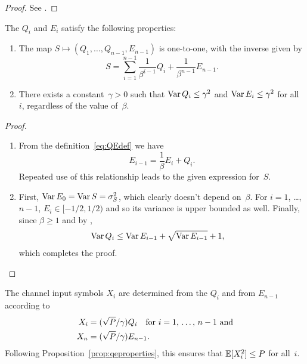 \begin{proof}
  See .
\end{proof}



\begin{proposition}
  \label{prop:qeproperties}
  The $Q_i$ and $E_i$ satisfy the following properties:
\begin{enumerate}
  \item The map $S \mapsto (Q_1, \dots, Q_{n-1}, E_{n-1})$ is one-to-one, with
    the inverse given by
    \begin{equation}
      \label{eq:unwraprec}
      S = \sum_{i=1}^{n-1} \frac{1}{\beta^{i-1}} Q_i + \frac{1}{\beta^{n-1}}
      E_{n-1}.
    \end{equation}

  \item There exists a constant~$\gamma > 0$ such that $\operatorname{Var} Q_i \le \gamma^2$
    and $\operatorname{Var} E_i \le \gamma^2$ for all~$i$, regardless of the value of~$\beta$.
\end{enumerate}
\end{proposition}

\goodbreak
\begin{proof}
  \begin{enumerate}
    \item From the definition~\eqref{eq:QEdef} we have
    \begin{equation}
      \label{eq:reverserec}
      E_{i-1} = \frac{1}{\beta} E_i + Q_i.
    \end{equation}
    Repeated use of this relationship leads to the given expression for~$S$. 

  \item First, $\operatorname{Var} E_0 = \operatorname{Var} S = {\sigma_S^2}$, which clearly doesn't depend
    on~$\beta$. For $i = 1$, \ldots, $n-1$, $E_i \in [-1/2, 1/2)$ and so its
    variance is upper bounded as well. Finally, since $\beta \ge 1$ and by
    , 
    \begin{align*}
      \operatorname{Var} Q_i &\le \operatorname{Var} E_{i-1} + \sqrt{\operatorname{Var} E_{i-1}} + 1,
    \end{align*}
    which completes the proof.
  \end{enumerate}
\end{proof}

The channel input symbols $X_i$ are determined from the $Q_i$ and from $E_{n-1}$
according to 
\begin{align}
  X_i &= (\sqrt{P}/\gamma) Q_i \quad
  \text{for $i = 1$, \dots, $n-1$ and} \nonumber\\
  X_n &= (\sqrt{P}/\gamma) E_{n-1}.
  \label{eq:Xdef}
\end{align}
Following Proposition~\ref{prop:qeproperties}, this ensures that $\mathbb{E}[X_i^2] \le
P$ for all~$i$. 



